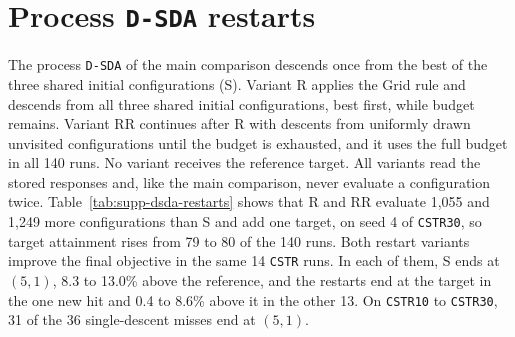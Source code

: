 \FloatBarrier

\section{Process \texttt{D-SDA} restarts}\label{sec:supp-dsda-restarts}
The process \texttt{D-SDA} of the main comparison descends once from the best of the three shared initial configurations (S).
Variant R applies the Grid rule and descends from all three shared initial configurations, best first, while budget remains.
Variant RR continues after R with descents from uniformly drawn unvisited configurations until the budget is exhausted, and it uses the full budget in all 140 runs.
No variant receives the reference target.
All variants read the stored responses and, like the main comparison, never evaluate a configuration twice.
Table~\ref{tab:supp-dsda-restarts} shows that R and RR evaluate 1,055 and 1,249 more configurations than S and add one target, on seed 4 of \texttt{CSTR30}, so target attainment rises from 79 to 80 of the 140 runs.
Both restart variants improve the final objective in the same 14 \texttt{CSTR} runs.
In each of them, S ends at \((5,1)\), 8.3 to 13.0\% above the reference, and the restarts end at the target in the one new hit and 0.4 to 8.6\% above it in the other 13.
On \texttt{CSTR10} to \texttt{CSTR30}, 31 of the 36 single-descent misses end at \((5,1)\).

